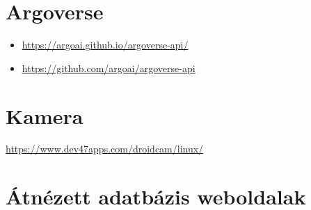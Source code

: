\documentclass[12pt]{report}
\begin{document}
\chapter{Argoverse}
\begin{itemize}
	\item \url{https://argoai.github.io/argoverse-api/}
	\item \url{https://github.com/argoai/argoverse-api}
\end{itemize}


\chapter{Kamera}
\url{https://www.dev47apps.com/droidcam/linux/}

\chapter{Átnézett adatbázis weboldalak}
\end{document}
